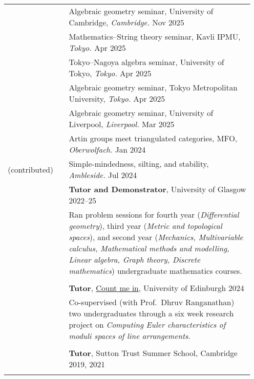 \documentclass[10pt]{article}
\newcommand{\nextItem}{\\[0.25em]}
\newcommand{\nextSection}{\\[0.5em]}
\begin{document}
\begin{longtable}{>{\raggedleft\arraybackslash}p{0.8in}>{}p{0.05in}>{}p{5.7in}}
	\nextSection%
	\multirow{2}{0.8in}{\raggedleft\arraybackslash Selected talks (invited)}%
	 &  & Algebraic geometry seminar, University of Cambridge, \emph{Cambridge.}
	\hfill Nov 2025\nextItem%
	 &  & Mathematics--String theory seminar, Kavli IPMU, \emph{Tokyo.}
	\hfill Apr 2025\nextItem%
	 &  & Tokyo--Nagoya algebra seminar, University of Tokyo, \emph{Tokyo.}
	\hfill Apr 2025\nextItem%
	 &  & Algebraic geometry seminar, Tokyo Metropolitan University, \emph{Tokyo.}
	\hfill Apr 2025\nextItem%
	 &  & Algebraic geometry seminar, University of Liverpool, \emph{Liverpool.}
	\hfill Mar 2025\nextItem%
	 &  & Artin groups meet triangulated categories, MFO, \emph{Oberwolfach.}
	\hfill Jan 2024\nextItem%
	(contributed)%
	 &  & Simple-mindedness, silting, and stability, \emph{Ambleside.}
	\hfill Jul 2024\nextSection%
	\multirow{2}{0.8in}{\raggedleft\arraybackslash Teaching \& outreach}%
	 &  & \textbf{Tutor and Demonstrator}, University of Glasgow \hfill
	2022--25                                                                               \\[0.25em]
	 &  & \begin{minipage}[c]{4.3in}
		      Ran problem sessions for fourth year (\emph{Differential geometry}),
		      third year (\emph{Metric and topological spaces}), and second year
		      (\emph{Mechanics, Multivariable calculus, Mathematical methods and
			      modelling, Linear algebra, Graph theory, Discrete mathematics})
		      undergraduate mathematics courses.
	      \end{minipage}              \\\\[-0.6em]
	 &  & \textbf{Tutor}, \href{https://www.agq-cdt.org/count-me-in/}{Count me
	in}, University of Edinburgh \hfill 2024                                               \\[0.25em]
	 &  & \begin{minipage}[c]{4.3in}
		      Co-supervised (with Prof.\ Dhruv Ranganathan) two undergraduates
		      through a six week research project on \emph{Computing Euler
			      characteristics of moduli spaces of line arrangements}.
	      \end{minipage}                  \\\\[-0.6em]
	 &  & \textbf{Tutor}, Sutton Trust Summer School, Cambridge \hfill
	2019, 2021                                                                             \\[0.25em]
	 &  & \begin{minipage}[c]{4.3in}

\end{minipage}
\end{longtable}
\end{document}
